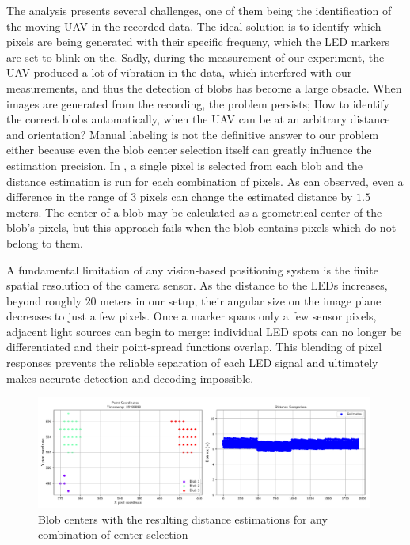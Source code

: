 The analysis presents several challenges, one of them being the identification of the moving \ac{UAV} in the recorded
data. The ideal solution is to identify which pixels are being generated with their specific frequeny, which the \ac{LED}
markers are set to blink on the. Sadly, during the measurement of our experiment, the \ac{UAV} produced a lot
of vibration in the data, which interfered with our measurements, and thus the detection of blobs has become a large obsacle.
When images are generated from the recording, the problem persists; How to identify the correct blobs automatically, when
the \ac{UAV} can be at an arbitrary distance and orientation?
Manual labeling is not the definitive answer to our problem either because even the blob center selection itself can greatly
influence the estimation precision. In , a single pixel is selected from each blob and the distance estimation is run
for each combination of pixels. As can observed, even a difference in the range of 3 pixels can change the estimated distance by
$1.5$ meters. The center of a blob may be calculated as a geometrical center of the blob's pixels, but this approach fails
when the blob contains pixels which do not belong to them. %

A fundamental limitation of any vision‐based positioning system is the finite spatial resolution of the camera sensor. As the distance to the \ac{LED}s increases, beyond roughly $20$ meters in our setup, their angular size on the image plane decreases to just a few pixels. Once a marker spans only a few sensor pixels, adjacent light sources can begin to merge: individual \ac{LED} spots can no longer be differentiated and their point-spread functions overlap. This blending of pixel responses prevents the reliable separation of each \ac{LED} signal and ultimately makes accurate detection and decoding impossible.

\begin{figure}[H]
	\centering
	\includegraphics[width=0.99\textwidth]{./fig/pgfplot/build/estimation_selection_1.pdf}
	\caption{Blob centers with the resulting distance estimations for any combination of center selection}
	\label{fig:blob_comb}
\end{figure}
